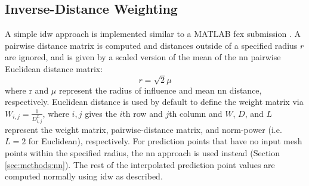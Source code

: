 \documentclass[preprint,12pt]{elsarticle}
\begin{document}

\subsection{Inverse-Distance Weighting} \label{sec:methods:idw}

A simple \gls{idw} approach is implemented similar to a MATLAB \gls{fex} submission \cite{tovarInverseDistanceWeight2020}. A pairwise distance matrix is computed and distances outside of a specified radius $r$ are ignored, and is given by a scaled version of the mean of the \gls{nn} pairwise Euclidean distance matrix: 
\begin{equation}
r=\sqrt{2} \mu
\end{equation}
where r and $\mu$ represent the radius of influence and mean \gls{nn} distance, respectively. Euclidean distance is used by default to define the weight matrix via $W_{i,j} = \frac{1}{D_{i,j}^L}$, where $i,j$ gives the $i$th row and $j$th column and $W$, $D$, and $L$ represent the weight matrix, pairwise-distance matrix, and norm-power (i.e. $L = 2$ for Euclidean), respectively. For prediction points that have no input mesh points within the specified radius, the \gls{nn} approach is used instead (Section \ref{sec:methods:nn}). The rest of the interpolated prediction point values are computed normally using \gls{idw} as described.
\end{document}
